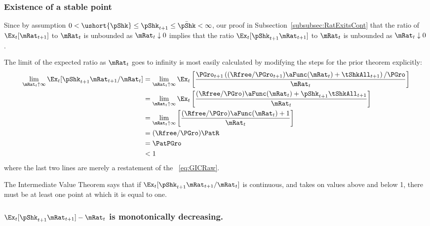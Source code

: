 \documentclass[\econtexRoot/BufferStockTheory]{subfiles}
\begin{document}
\subsubsection{Existence of a stable point}

Since by assumption $ 0 < \ushort{\pShk} \leq \pShk_{t+1} \leq \bar{\pShk} < \infty$, our proof in Subsection~\ref{subsubsec:RatExitsCont} that the ratio of $\Ex_{t}[\mRat_{t+1}]$ to $\mRat_{t}$ is unbounded as $\mRat_{t} \downarrow 0$ implies that the ratio $\Ex_{t}[\pShk_{t+1}\mRat_{t+1}]$ to $\mRat_{t}$ is unbounded as $\mRat_{t} \downarrow 0$.

The limit of the expected ratio as $\mRat_{t}$ goes to infinity is most easily calculated by modifying the steps for the prior theorem explicitly:
\begin{align}
  \lim_{\mRat_{t} \uparrow \infty} \Ex_{t}[\pShk_{t+1}\mRat_{t+1}/\mRat_{t}]  & =   
                                                                  \lim_{\mRat_{t} \uparrow \infty} 
                                                                  \Ex_{t}\left[\frac{\PGro_{t+1}\left((\Rfree/\PGro_{t+1})\aFunc(\mRat_{t})+{\tShkAll}_{t+1}\right)/\PGro}{\mRat_{t}}\right] \notag 
  \\   & =   \lim_{\mRat_{t} \uparrow \infty} \Ex_{t}\left[
         \frac{(\Rfree/\PGro)\aFunc(\mRat_{t})+\pShk_{t+1}{\tShkAll}_{t+1}}{\mRat_{t}}
         \right] \notag 
  \\   & =   \lim_{\mRat_{t} \uparrow \infty} \left[
         \frac{(\Rfree/\PGro)\aFunc(\mRat_{t})+1}{\mRat_{t}}
         \right] \notag 
  \\  & = (\Rfree/\PGro)\PatR \label{eq:emgro2}
  \\  & = \PatPGro \notag
  \\  & < 1 \notag
\end{align}
where the last two lines are merely a restatement of the \GICRaw~\eqref{eq:GICRaw}.

The Intermediate Value Theorem says that if $\Ex_{t}[\pShk_{t+1}\mRat_{t+1}/\mRat_t]$ is continuous, and takes on values above and below 1, there must be at least one point at which it is equal to one.

\subsubsection{\texorpdfstring{$\Ex_{t}[\pShk_{t+1}\mRat_{t+1}] -\mRat_t$}{pShk m{t+1} --- m{t}} is monotonically decreasing.}
\end{document}
